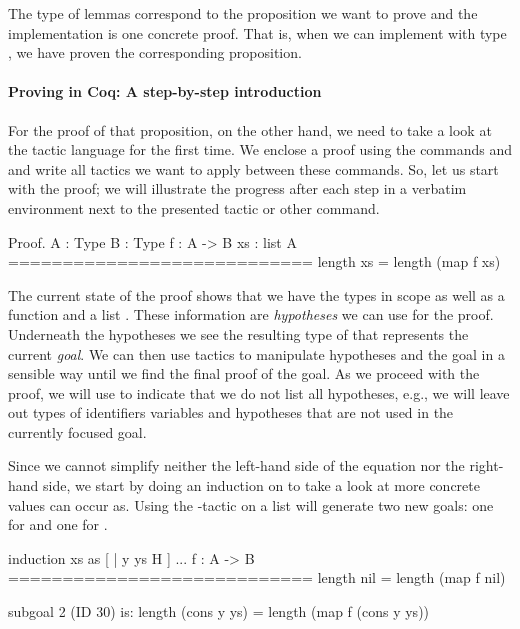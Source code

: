 The type of lemmas correspond to the proposition we want to prove and the implementation is one concrete proof.
That is, when we can implement  with type , we have proven the corresponding proposition.

\paragraph{Proving in Coq: A step-by-step introduction}
For the proof of that proposition, on the other hand, we need to take a look at the tactic language  for the first time.
We enclose a proof using the commands  and  and write all tactics we want to apply between these commands.
So, let us start with the proof; we will illustrate the progress after each step in a verbatim environment next to the presented tactic or other command.

\begin{cproof}{Proof.}
  A : Type
  B : Type
  f : A -> B
  xs : list A
  ============================
  length xs = length (map f xs)
\end{cproof}

The current state of the proof shows that we have the types  in scope as well as a function  and a list .
These information are \emph{hypotheses} we can use for the proof.
Underneath the hypotheses we see the resulting type of  that represents the current \emph{goal}.
We can then use tactics to manipulate hypotheses and the goal in a sensible way until we find the final proof of the goal.
 As we proceed with the proof, we will use  to indicate that we do not list all hypotheses, e.g., we will leave out types of identifiers variables and hypotheses that are not used in the currently focused goal.

Since we cannot simplify neither the left-hand side of the equation nor the right-hand side, we start by doing an induction on  to take a look at more concrete values  can occur as.
Using the -tactic on a list will generate two new goals: one for  and one for .

\begin{cproof}{induction xs as [ | y ys H ]}
  ...
  f : A -> B
  ============================
  length nil = length (map f nil)

subgoal 2 (ID 30) is:
length (cons y ys) =
length (map f (cons y ys))
\end{cproof}


